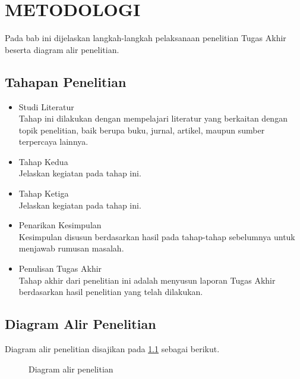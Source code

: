\chapter{METODOLOGI}
Pada bab ini dijelaskan langkah-langkah pelaksanaan penelitian Tugas Akhir beserta diagram alir penelitian.

\section{Tahapan Penelitian}
\begin{itemize}
    \item[(a)] Studi Literatur\\
    Tahap ini dilakukan dengan mempelajari literatur yang berkaitan dengan topik penelitian, baik berupa buku, jurnal, artikel, maupun sumber terpercaya lainnya.
    \item[(b)] Tahap Kedua\\
    Jelaskan kegiatan pada tahap ini.
    \item[(c)] Tahap Ketiga\\
    Jelaskan kegiatan pada tahap ini.
    \item[(d)] Penarikan Kesimpulan\\
    Kesimpulan disusun berdasarkan hasil pada tahap-tahap sebelumnya untuk menjawab rumusan masalah.
    \item[(e)] Penulisan Tugas Akhir\\
    Tahap akhir dari penelitian ini adalah menyusun laporan Tugas Akhir berdasarkan hasil penelitian yang telah dilakukan.
\end{itemize}

\section{Diagram Alir Penelitian}
Diagram alir penelitian disajikan pada \ref{fig:diagram_alir} sebagai berikut.
\begin{figure}[H]
    \centering
    
    \caption{Diagram alir penelitian}
    \label{fig:diagram_alir}
\end{figure}
